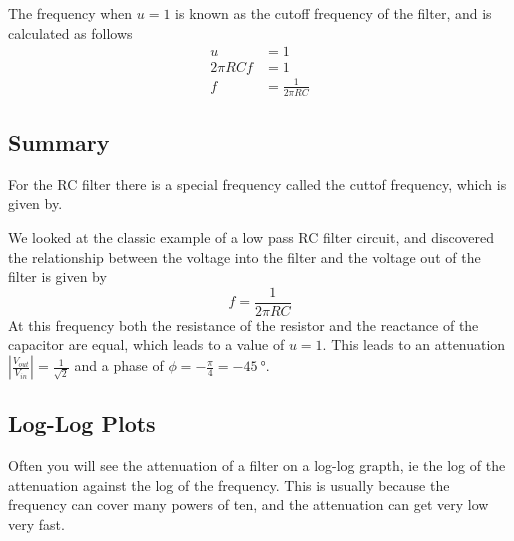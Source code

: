 The frequency when $u=1$ is known as the cutoff frequency of the filter, and
is calculated as follows
\begin{align}
  u &= 1 \nonumber \\
  2\pi R C f &= 1 \nonumber \\
  f &= \frac{1}{2\pi R C} \label{eq:RC_cuttof}
\end{align}

\begin{framed}
\subsection*{Summary}
For the RC filter there is a special frequency called the cuttof frequency, which
is given by.

We looked at the classic example of a low pass RC filter circuit, and discovered
the relationship between the voltage into the filter and the voltage out of the
filter is given by
\begin{equation*}
  f = \frac{1}{2\pi R C}
\end{equation*}
At this frequency both the resistance of the resistor and the reactance of the
capacitor are equal, which leads to a value of $u=1$.
This leads to an attenuation $\left|\frac{V_{out}}{V_{in}}\right| = \frac{1}{\sqrt{2}}$ and
a phase of $\phi=-\frac{\pi}{4}=-\SI{45}{\degree}$.
\end{framed}

\subsection{Log-Log Plots}
Often you will see the attenuation of a filter on a log-log grapth, ie the log
of the attenuation against the log of the frequency. This is usually because
the frequency can cover many powers of ten, and the attenuation can get very low
very fast.

